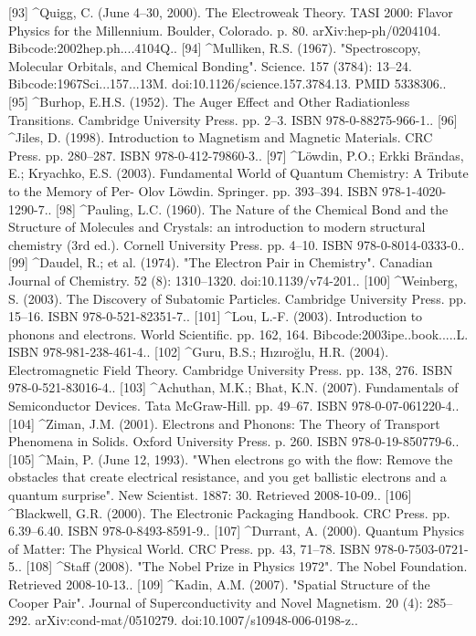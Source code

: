 [93]
^Quigg, C. (June 4–30, 2000). The Electroweak Theory. TASI 2000: Flavor Physics for the Millennium. Boulder, Colorado. p. 80. arXiv:hep-ph/0204104. Bibcode:2002hep.ph....4104Q..
[94]
^Mulliken, R.S. (1967). "Spectroscopy, Molecular Orbitals, and Chemical Bonding". Science. 157 (3784): 13–24. Bibcode:1967Sci...157...13M. doi:10.1126/science.157.3784.13. PMID 5338306..
[95]
^Burhop, E.H.S. (1952). The Auger Effect and Other Radiationless Transitions. Cambridge University Press. pp. 2–3. ISBN 978-0-88275-966-1..
[96]
^Jiles, D. (1998). Introduction to Magnetism and Magnetic Materials. CRC Press. pp. 280–287. ISBN 978-0-412-79860-3..
[97]
^Löwdin, P.O.; Erkki Brändas, E.; Kryachko, E.S. (2003). Fundamental World of Quantum Chemistry: A Tribute to the Memory of Per- Olov Löwdin. Springer. pp. 393–394. ISBN 978-1-4020-1290-7..
[98]
^Pauling, L.C. (1960). The Nature of the Chemical Bond and the Structure of Molecules and Crystals: an introduction to modern structural chemistry (3rd ed.). Cornell University Press. pp. 4–10. ISBN 978-0-8014-0333-0..
[99]
^Daudel, R.; et al. (1974). "The Electron Pair in Chemistry". Canadian Journal of Chemistry. 52 (8): 1310–1320. doi:10.1139/v74-201..
[100]
^Weinberg, S. (2003). The Discovery of Subatomic Particles. Cambridge University Press. pp. 15–16. ISBN 978-0-521-82351-7..
[101]
^Lou, L.-F. (2003). Introduction to phonons and electrons. World Scientific. pp. 162, 164. Bibcode:2003ipe..book.....L. ISBN 978-981-238-461-4..
[102]
^Guru, B.S.; Hızıroğlu, H.R. (2004). Electromagnetic Field Theory. Cambridge University Press. pp. 138, 276. ISBN 978-0-521-83016-4..
[103]
^Achuthan, M.K.; Bhat, K.N. (2007). Fundamentals of Semiconductor Devices. Tata McGraw-Hill. pp. 49–67. ISBN 978-0-07-061220-4..
[104]
^Ziman, J.M. (2001). Electrons and Phonons: The Theory of Transport Phenomena in Solids. Oxford University Press. p. 260. ISBN 978-0-19-850779-6..
[105]
^Main, P. (June 12, 1993). "When electrons go with the flow: Remove the obstacles that create electrical resistance, and you get ballistic electrons and a quantum surprise". New Scientist. 1887: 30. Retrieved 2008-10-09..
[106]
^Blackwell, G.R. (2000). The Electronic Packaging Handbook. CRC Press. pp. 6.39–6.40. ISBN 978-0-8493-8591-9..
[107]
^Durrant, A. (2000). Quantum Physics of Matter: The Physical World. CRC Press. pp. 43, 71–78. ISBN 978-0-7503-0721-5..
[108]
^Staff (2008). "The Nobel Prize in Physics 1972". The Nobel Foundation. Retrieved 2008-10-13..
[109]
^Kadin, A.M. (2007). "Spatial Structure of the Cooper Pair". Journal of Superconductivity and Novel Magnetism. 20 (4): 285–292. arXiv:cond-mat/0510279. doi:10.1007/s10948-006-0198-z..
